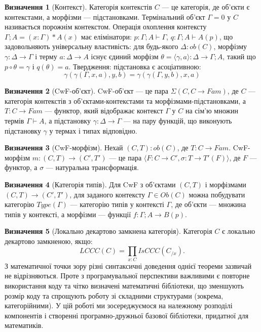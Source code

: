 \documentclass{article}
\theoremstyle{definition}
\newtheorem{definition}{Визначення}[section]
\begin{document}
\begin{definition}[Контекст]
Категорія контекстів $C$ --- це категорія, де об’єкти є контекстами, а морфізми --- підстановками. Термінальний об’єкт $\Gamma=0$ у $C$ називається порожнім контекстом. Операція охоплення контексту $\Gamma;A = (x:\Gamma)*A(x)$ має елімінатори: $p:\Gamma;A\vdash\Gamma$, $q:\Gamma;A\vdash A(p)$, що задовольняють універсальну властивість: для будь-якого $\Delta:ob(C)$, морфізму $\gamma:\Delta\rightarrow\Gamma$ і терму $a:\Delta\rightarrow A$ існує єдиний морфізм $\theta=\langle\gamma,a\rangle:\Delta\rightarrow\Gamma;A$, такий що $p\circ\theta=\gamma$ і $q(\theta)=a$. Твердження: підстановка є асоціативною:
\[
    \gamma(\gamma(\Gamma,x,a),y,b) = \gamma(\gamma(\Gamma,y,b),x,a)
\]
\end{definition}

\begin{definition}[CwF-об’єкт]
CwF-об’єкт --- це пара $\Sigma(C, C\rightarrow Fam)$, де $C$ --- категорія контекстів з об’єктами-контекстами та морфізмами-підстановками, а $T:C\rightarrow Fam$ --- функтор, який відображає контекст $\Gamma$ у $C$ на сім’ю множин термів $\Gamma\vdash A$, а підстановку $\gamma:\Delta\rightarrow\Gamma$ --- на пару функцій, що виконують підстановку $\gamma$ у термах і типах відповідно.
\end{definition}

\begin{definition}[CwF-морфізм]
Нехай $(C,T):ob(C)$, де $T:C\rightarrow Fam$. CwF-морфізм $m: (C,T)\rightarrow(C',T')$ --- це пара $\langle F:C\rightarrow C', \sigma:T\rightarrow T'(F) \rangle$, де $F$ --- функтор, а $\sigma$ --- натуральна трансформація.
\end{definition}

\begin{definition}[Категорія типів]
Для CwF з об’єктами $(C,T)$ і морфізмами $(C,T)\rightarrow(C',T')$, для заданого контексту $\Gamma \in Ob(C)$ можна побудувати категорію $Type(\Gamma)$ --- категорію типів у контексті $\Gamma$, де об’єкти --- множина типів у контексті, а морфізми --- функції $f:\Gamma;A\rightarrow B(p)$.
\end{definition}

\begin{definition}[Локально декартово замкнена категорія]
Категорія $C$ є локально декартово замкненою, якщо:
\[
    LCCC(C) = \prod_{x:C} IsCCC(C_{/x}).
\]
З математичної точки зору різні синтаксичні доведення однієї теореми зазвичай не відрізняються. Проте з програмувальної перспективи важливими є повторне використання коду та чітко визначені математичні бібліотеки, що зменшують розмір коду та спрощують роботу зі складними структурами (зокрема, категорійними). У цій роботі ми зосереджуємося на належному розподілі компонентів і створенні програмно-дружньої базової бібліотеки, придатної для математиків.
\end{definition}
\end{document}
